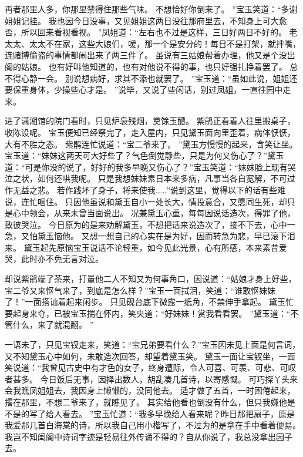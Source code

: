 再者那里人多，你那里禁得住那些气味。
不想恰好你倒来了。
”宝玉笑道：“多谢姐姐记挂。
我也因今日没事，又见姐姐这两日没往那府里去，不知身上可大愈否，所以回来看视看视。
”凤姐道：“左右也不过是这样，三日好两日不好的。
老太太、太太不在家，这些大娘们，嗳，那一个是安分的！每日不是打架，就拌嘴，连赌博偷盗的事情都闹出来了两三件了。
虽说有三姑娘帮着办理，他又是个没出阁的姑娘。
也有好叫他知道的，也有对他说不得的事，也只好强扎挣着罢了。
总不得心静一会。
别说想病好，求其不添也就罢了。
”宝玉道：“虽如此说，姐姐还要保重身体，少操些心才是。
”说毕，又说了些闲话，别过凤姐，一直往园中走来。
\par
进了潇湘馆的院门看时，只见炉袅残烟，奠馀玉醴。
紫鹃正看着人往里搬桌子，收陈设呢。
宝玉便知已经祭完了，走入屋内，只见黛玉面向里歪着，病体恹恹，大有不胜之态。
紫鹃连忙说道：“宝二爷来了。
”黛玉方慢慢的起来，含笑让坐。
宝玉道：“妹妹这两天可大好些了？气色倒觉静些，只是为何又伤心了？”黛玉道：“可是你没的说了，好好的我多早晚又伤心了？”宝玉笑道：“妹妹脸上现有哭泣之状，如何还哄我呢。
只是我想妹妹素日本来多病，凡事当各自宽解，不可过作无益之悲。
若作践坏了身子，将来使我……”说到这里，觉得以下的话有些难说，连忙咽住。
只因他虽说和黛玉自小一处长大，情投意合，又愿同生死，却只是心中领会，从来未曾当面说出。
况兼黛玉心重，每每因说话造次，得罪了他，致彼哭泣。
今日原为的是来劝解黛玉，不想把话来说造次了，接不下去，心中一急，又怕黛玉恼他。
又想一想自己的心实在是为好，因而转急为悲，早已滚下泪来。
黛玉起先原恼宝玉说话不论轻重，如今见此光景，心有所感，本来素昔爱哭，此时亦不免无言对泣。
\par
却说紫鹃端了茶来，打量他二人不知又为何事角口，因说道：“姑娘才身上好些，宝二爷又来怄气来了，到底是怎么样？”宝玉一面拭泪，笑道：“谁敢怄妹妹了！”一面搭讪着起来闲步。
只见砚台底下微露一纸角，不禁伸手拿起。
黛玉忙要起身来夺，已被宝玉揣在怀内，笑央道：“好妹妹！赏我看看罢。
”黛玉道：“不管什么，来了就混翻。
”\par
一语未了，只见宝钗走来，笑道：“宝兄弟要看什么？”宝玉因未见上面是何言词，又不知黛玉心中如何，未敢造次回答，却望着黛玉笑。
黛玉一面让宝钗坐，一面笑说道：“我曾见古史中有才色的女子，终身遭际，令人可喜、可羡、可悲、可叹者甚多。
今日饭后无事，因择出数人，胡乱凑几首诗，以寄感慨。
可巧探丫头来会我瞧凤姐姐去，我因身上懒懒的，没同他去。
适才做了五首，一时困倦起来，撂在那里，不想二爷来了，就瞧见了。
其实给他看也倒没有什么，但只我嫌他是不是的写了给人看去。
”宝玉忙道：“我多早晚给人看来呢？昨日那把扇子，原是我爱那几首白海棠的诗，所以我自己用小楷写了，不过为的是拿在手中看着便易。
我岂不知闺阁中诗词字迹是轻易往外传诵不得的？自从你说了，我总没拿出园子去。

